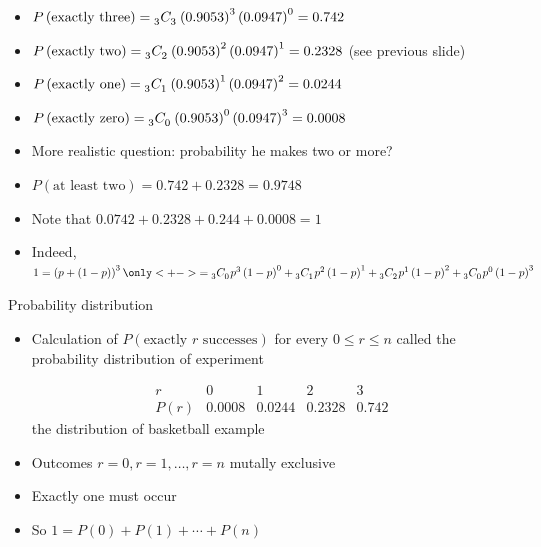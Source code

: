 \documentclass[handout,xcolor=dvipsnames]{beamer}
\theoremstyle{definition}
\newcommand\ncr[2]{\tensor[_{#1}]C{_{#2}}}
\begin{document}
\begin{frame}
\begin{itemize}
\item $P\left(\text{exactly three}\right)
=\ncr{3}{3}\left(0.9053\right)^3\left(0.0947\right)^0=0.742$
\item $P\left(\text{exactly two}\right)
=\ncr{3}{2}\left(0.9053\right)^2\left(0.0947\right)^1=0.2328$
(see previous slide)
\item $P\left(\text{exactly one}\right)
=\ncr{3}{1}\left(0.9053\right)^1\left(0.0947\right)^2=0.0244$
\item $P\left(\text{exactly zero}\right)
=\ncr{3}{0}\left(0.9053\right)^0\left(0.0947\right)^3=0.0008$
\item More realistic question: probability he makes two or more?
\item $P\left(\text{at least two}\right)=0.742+0.2328=0.9748$
\item Note that $0.0742+0.2328+0.244+0.0008=1$
\item Indeed, $1=\left(p+\left(1-p\right)\right)^3
\only<+->{=\ncr{3}{0}p^3\left(1-p\right)^0
+\ncr{3}{1}p^2\left(1-p\right)^1
+\ncr{3}{2}p^1\left(1-p\right)^2
+\ncr{3}{0}p^0\left(1-p\right)^3}$
\end{itemize}
\end{frame}

\begin{frame}{Probability distribution}
\begin{itemize}
\item Calculation of $P\left(\text{exactly $r$ successes}\right)$
for every $0\le r\le n$ called the \alert{probability distribution}
of experiment
\begin{example}
\[\begin{array}{r|rrrr}
r&0&1&2&3\\\hline
P\left(r\right)
&0.0008&0.0244&0.2328&0.742
\end{array}\]
the distribution of basketball example
\end{example}
\item Outcomes $r=0,r=1,\ldots,r=n$
mutally exclusive
\item Exactly one must occur
\item So $1=
P\left(0\right)+P\left(1\right)+\cdots+P\left(n\right)$
\end{itemize}
\end{frame}
\end{document}
